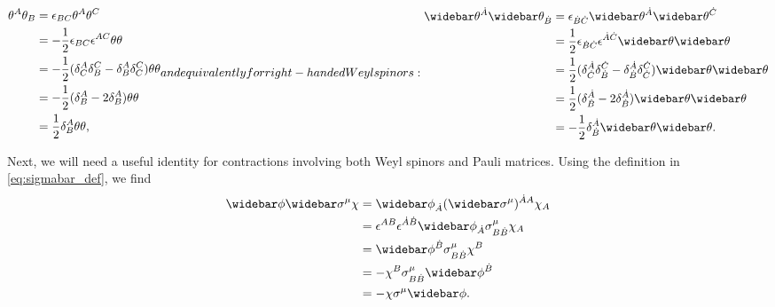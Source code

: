 \begin{subequations}
\label{eq:weyl_proof_thetaAB_delta}
\begin{align}
    \theta^A\theta_B &= \epsilon_{BC}\theta^A\theta^C
    \nonumber \\
    &= -\frac{1}{2}\epsilon_{BC}\epsilon^{AC} \thetatwo
    \nonumber \\
    &= -\frac{1}{2} (\delta^A_C\delta^C_B - \delta^A_B\delta^C_C) \thetatwo
    \nonumber \\
    &= -\frac{1}{2} (\delta^A_B - 2\delta^A_B) \thetatwo
    \nonumber \\
    &= \frac{1}{2} \delta^A_B \thetatwo,
\end{align}
and equivalently for right-handed Weyl spinors:
\begin{align}
    \thetabar^{\dot{A}}\thetabar_{\dot{B}} &= \epsilon_{\dot{B}\dot{C}}\thetabar^{\dot{A}}\thetabar^{\dot{C}}
    \nonumber \\
    &= \frac{1}{2}\epsilon_{\dot{B}\dot{C}}\epsilon^{\dot{A}\dot{C}} \thetabartwo
    \nonumber \\
    &= \frac{1}{2} (\delta^{\dot{A}}_{\dot{C}}\delta^{\dot{C}}_{\dot{B}} - \delta^{\dot{A}}_{\dot{B}}\delta^{\dot{C}}_{\dot{C}}) \thetabartwo
    \nonumber \\
    &= \frac{1}{2} (\delta^{\dot{A}}_{\dot{B}} - 2\delta^{\dot{A}}_{\dot{B}}) \thetabartwo
    \nonumber \\
    &= -\frac{1}{2} \delta^{\dot{A}}_{\dot{B}} \thetabartwo.
\end{align}
\end{subequations}

Next, we will need a useful identity for contractions involving both Weyl spinors and Pauli matrices. Using the definition in \cref{eq:sigmabar_def}, we find
\begin{align}
    \widebar\phi\widebar\sigma^\mu\chi &= \widebar\phi_{\dot{A}}(\widebar\sigma^\mu)^{\dot{A}A}\chi_A
    \nonumber \\
    &= \epsilon^{AB}\epsilon^{\dot{A}\dot{B}} \widebar\phi_{\dot{A}}\sigma^\mu_{B\dot{B}}\chi_A
    \nonumber \\
    &= \widebar\phi^{\dot{B}}\sigma^\mu_{B\dot{B}}\chi^B
    \nonumber \\
    &= -\chi^B\sigma^\mu_{B\dot{B}}\widebar\phi^{\dot{B}}
    \nonumber \\
    &= -\chi\sigma^\mu\widebar\phi.
    \label{eq:weyl_proof_sigmabar_to_sigma}
\end{align}

